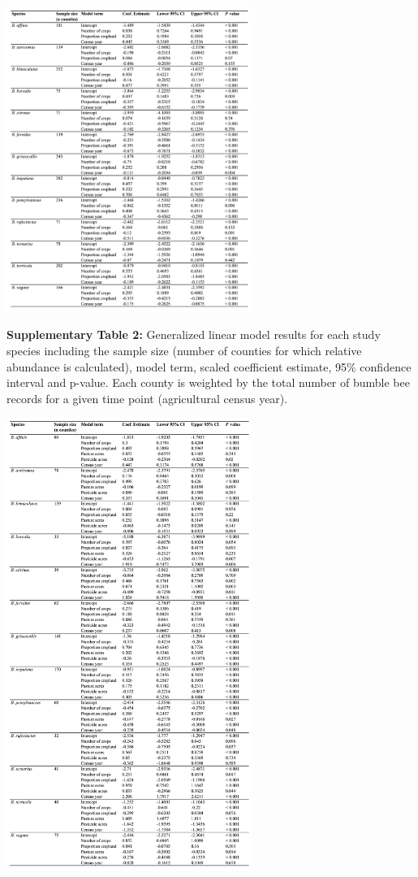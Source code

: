 \documentclass[11pt,]{article}
\begin{document}
\includegraphics[width=0.6\textwidth,height=\textheight]{../ms_figs/tables1.png}

\clearpage

\newpage

\textbf{Supplementary Table 2:} Generalized linear model results for
each study species including the sample size (number of counties for
which relative abundance is calculated), model term, scaled coefficient
estimate, 95\% confidence interval and p-value. Each county is weighted
by the total number of bumble bee records for a given time point
(agricultural census year).

\includegraphics[width=0.6\textwidth,height=\textheight]{../ms_figs/tables2.png}
\end{document}
